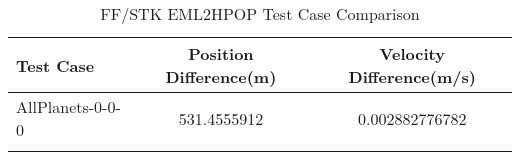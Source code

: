 \begin{table}[htbp!]
\centering
\caption{ FF/STK EML2HPOP Test Case Comparison}
      \begin{tabular}{lcc}
      \hline\hline
          Test Case & Position Difference(m) & Velocity Difference(m/s) \\
         \hline
         AllPlanets-0-0-0 & 531.4555912 & 0.002882776782 \\
      \hline\hline
      \label{Table: EML2HPOP FF-STK Table} 
\end{tabular}
\end{table}

